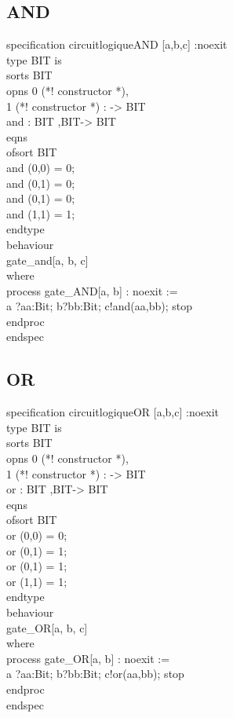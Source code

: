 \documentclass{article}
\begin{document}
   \subsection*{AND}
    specification circuitlogiqueAND [a,b,c] :noexit \\
    type BIT is \\
        sorts BIT\\
        opns 0 (*! constructor *), \\
            1 (*! constructor *) : -> BIT\\
        and : BIT ,BIT-> BIT\\
        eqns \\
            ofsort BIT \\
            and (0,0) = 0; \\
            and (0,1) = 0; \\
            and (0,1) = 0; \\
            and (1,1) = 1; \\
    endtype\\ 
    behaviour\\ 
        gate_and[a, b, c]\\
    where \\
        process gate_AND[a, b] : noexit :=\\ 
        a ?aa:Bit; b?bb:Bit;  c!and(aa,bb); stop \\
        endproc \\
    endspec\\
    \subsection*{OR}
    specification circuitlogiqueOR [a,b,c] :noexit \\
    type BIT is \\
        sorts BIT\\
        opns 0 (*! constructor *), \\
            1 (*! constructor *) : -> BIT\\
        or : BIT ,BIT-> BIT\\
        eqns \\
            ofsort BIT \\
            or (0,0) = 0; \\
            or (0,1) = 1; \\
            or (0,1) = 1; \\
            or (1,1) = 1; \\
    endtype\\ 
    behaviour\\ 
        gate_OR[a, b, c]\\
    where \\
        process gate_OR[a, b] : noexit :=\\ 
        a ?aa:Bit; b?bb:Bit;  c!or(aa,bb); stop \\
        endproc \\
    endspec\\
\end{document}

